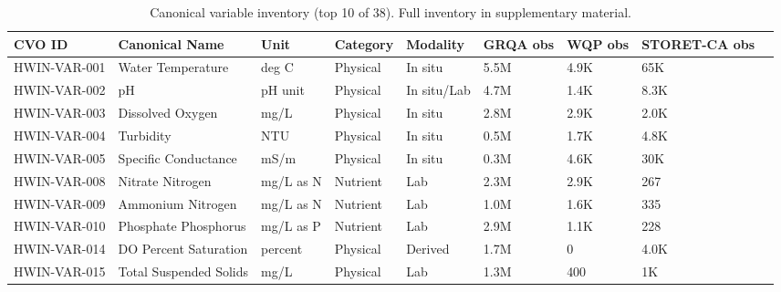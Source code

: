 \begin{table}
\caption{Canonical variable inventory (top 10 of 38). Full inventory in supplementary material.}
\label{tab:variables}
\begin{tabular}{lllllllll}
\toprule
CVO ID & Canonical Name & Unit & Category & Modality & GRQA obs & WQP obs & STORET-CA obs \\
\midrule
HWIN-VAR-001 & Water Temperature & deg C & Physical & In situ & 5.5M & 4.9K & 65K \\
HWIN-VAR-002 & pH & pH unit & Physical & In situ/Lab & 4.7M & 1.4K & 8.3K \\
HWIN-VAR-003 & Dissolved Oxygen & mg/L & Physical & In situ & 2.8M & 2.9K & 2.0K \\
HWIN-VAR-004 & Turbidity & NTU & Physical & In situ & 0.5M & 1.7K & 4.8K \\
HWIN-VAR-005 & Specific Conductance & mS/m & Physical & In situ & 0.3M & 4.6K & 30K \\
HWIN-VAR-008 & Nitrate Nitrogen & mg/L as N & Nutrient & Lab & 2.3M & 2.9K & 267 \\
HWIN-VAR-009 & Ammonium Nitrogen & mg/L as N & Nutrient & Lab & 1.0M & 1.6K & 335 \\
HWIN-VAR-010 & Phosphate Phosphorus & mg/L as P & Nutrient & Lab & 2.9M & 1.1K & 228 \\
HWIN-VAR-014 & DO Percent Saturation & percent & Physical & Derived & 1.7M & 0 & 4.0K \\
HWIN-VAR-015 & Total Suspended Solids & mg/L & Physical & Lab & 1.3M & 400 & 1K \\
\bottomrule
\end{tabular}
\end{table}

